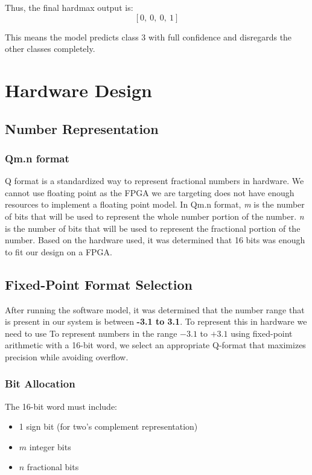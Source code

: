 \documentclass{article}
\begin{document}
\noindent Thus, the final hardmax output is:
\[
[0,\ 0,\ 0,\ 1]
\]

\noindent This means the model predicts class 3 with full confidence and disregards the other classes completely.

\section{Hardware Design}
\subsection{Number Representation}
\subsubsection{Qm.n format} 
Q format is a standardized way to represent fractional numbers in hardware. We cannot use floating point as the FPGA we are targeting does not have enough resources to implement a floating point model. In Qm.n format, \emph{m} is the number of bits that will be used to represent the whole number portion of the number. \emph{n} is the number of bits that will be used to represent the fractional portion of the number. Based on the hardware used, it was determined that 16 bits was enough to fit our design on a FPGA.
\subsection{Fixed-Point Format Selection}
After running the software model, it was determined that the number range that is present in our system is between \textbf{-3.1 to 3.1}. To represent this in hardware we need to use
To represent numbers in the range \(-3.1\) to \(+3.1\) using fixed-point arithmetic with a 16-bit word, we select an appropriate Q-format that maximizes precision while avoiding overflow.

\subsubsection*{Bit Allocation}

The 16-bit word must include:
\begin{itemize}
  \item 1 sign bit (for two's complement representation)
  \item \(m\) integer bits
  \item \(n\) fractional bits
\end{itemize}
\end{document}
